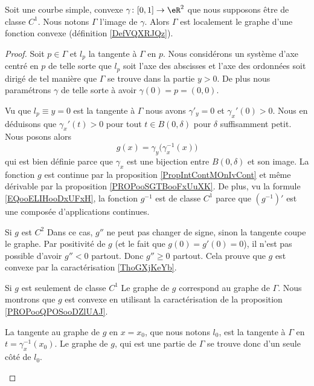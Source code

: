 \begin{lemma}        \label{LEMooGEVEooHxPTMO}
    Soit une courbe simple, convexe \( \gamma\colon \mathopen[ 0 , 1 \mathclose]\to \eR^2\) que nous supposons être de classe \( C^1\). Nous notons \( \Gamma\) l'image de \( \gamma\). Alors \( \Gamma\) est localement le graphe d'une fonction convexe (définition \ref{DefVQXRJQz}).
\end{lemma}

\begin{proof}
    Soit \( p\in \Gamma\) et \( l_p\) la tangente à \( \Gamma\) en \( p\). Nous considérons un système d'axe centré en \( p\) de telle sorte que \( l_p\) soit l'axe des abscisses et l'axe des ordonnées soit dirigé de tel manière que \( \Gamma\) se trouve dans la partie \( y>0\). De plus nous paramétrons \( \gamma\) de telle sorte à avoir \( \gamma(0)=p=(0,0)\).

    Vu que \( l_p\equiv y=0\) est la tangente à \( \Gamma\) nous avons \( \gamma'_y=0\) et \( \gamma_x'(0)>0\). Nous en déduisons que \( \gamma_x'(t)>0\) pour tout \( t\in B(0,\delta)\) pour \( \delta\) suffisamment petit. Nous posons alors
    \begin{equation}
        g(x)=\gamma_y\big( \gamma_x^{-1}(x) \big)
    \end{equation}
    qui est bien définie parce que \( \gamma_x\) est une bijection entre \( B(0,\delta)\) et son image. La fonction \( g\) est continue par la proposition \ref{PropIntContMOnIvCont} et même dérivable par la proposition \ref{PROPooSGTBooFxUuXK}. De plus, vu la formule \eqref{EQooELIHooDxUFxH}, la fonction \( g^{-1}\) est de classe \( C^1\) parce que \( (g^{-1})'\) est une composée d'applications continues.

    \begin{subproof}
        \item[Si \( g\) est \( C^2\)]
            Dans ce cas, \( g''\) ne peut pas changer de signe, sinon la tangente coupe le graphe. Par positivité de \( g\) (et le fait que \( g(0)=g'(0)=0\)), il n'est pas possible d'avoir \( g''<0\) partout. Donc \( g''\geq 0\) partout. Cela prouve que \( g\) est convexe par la caractérisation \ref{ThoGXjKeYb}.
        \item[Si \( g\) est seulement de classe \( C^1\)]
            Le graphe de \( g\) correspond au graphe de \( \Gamma\). Nous montrons que \( g\) est convexe en utilisant la caractérisation de la proposition \ref{PROPooQPOSooDZlUAJ}.
    
            La tangente au graphe de \( g\) en \( x=x_0\), que nous notons \( l_0\), est la tangente à \( \Gamma\) en \( t=\gamma_x^{-1}(x_0)\). Le graphe de \( g\), qui est une partie de \( \Gamma\) se trouve donc d'un seule côté de \(l_0\).


\end{subproof}
\end{proof}
